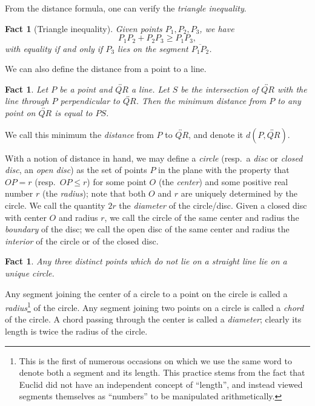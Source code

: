 \documentclass[12pt]{book}
\numberwithin{exc}{section}
\numberwithin{figure}{section}
\newtheorem{fact}[theorem]{Fact}
\numberwithin{equation}{theorem}
\def\line#1{\overleftrightarrow{#1}}
\def\seg#1{\overline{#1}}
\begin{document}
From the distance formula, one can verify the \emph{triangle inequality}.
\begin{fact}[Triangle inequality]
Given points $P_1, P_2, P_3$, we have
\[
P_1P_2 + P_2P_3 \geq P_1P_3,
\]
with equality if and only if $P_3$ lies on the segment $\seg{P_1P_2}$.
\end{fact}

We can also define the distance from a point to a line.
\begin{fact}
Let $P$ be a point and $\line{QR}$ a line. Let $S$ be the intersection of 
$\line{QR}$
with the line through $P$ perpendicular to $\line{QR}$. 
Then the minimum distance
from $P$ to any point on $\line{QR}$ is equal to $PS$.
\end{fact}
We call this minimum the \emph{distance} from $P$ to $\line{QR}$, and denote it
$d(P,\line{QR})$.

With a notion of distance in hand, we may define
a \emph{circle}  (resp.\ a \emph{disc}
 or \emph{closed disc},
 
an \emph{open disc}) 
as the set of points $P$ in the plane with the property that 
$OP = r$ (resp.\ $OP \leq r$)
for some point $O$ (the \emph{center})  and
some positive real number $r$ (the \emph{radius});  note that both $O$ and $r$ are uniquely determined by the circle. We call the quantity
$2r$ the \emph{diameter}  
of the circle/disc.
Given a closed disc with center $O$ and radius $r$, we call the circle
of the same center and radius the \emph{boundary} of the disc;
we call the open disc of the same center and radius the
\emph{interior} of the circle or of the closed disc.
\begin{fact}
Any three distinct points which do not lie on a straight line lie on
a unique circle.
\end{fact}

Any segment joining the center of a circle to a point on the circle is
called a \emph{radius}\footnote{This is the first of numerous occasions
on which we use the same word to denote both a segment and its length.
This practice stems from the fact that Euclid did not have an independent
concept of ``length'', and instead viewed segments themselves as
``numbers'' to be manipulated arithmetically.}  of the circle. 
Any segment joining two points on a circle is
called a \emph{chord} 
of the circle. A chord passing through the center is
called a \emph{diameter}; clearly its length is twice the radius of the 
circle.
\end{document}
